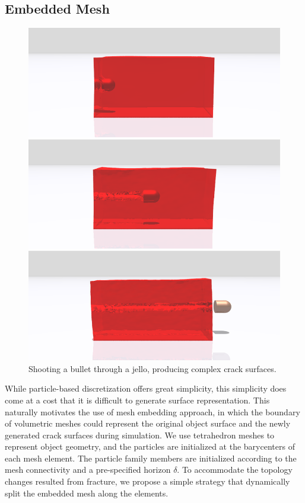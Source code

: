 \subsection{Embedded Mesh}
\begin{figure}[t]
  \centering
  \includegraphics[width=\linewidth]{../figs/demo_jello.png}
  \caption{\label{fig:7}
  Shooting a bullet through a jello, producing complex crack surfaces.
}
\end{figure}
While particle-based discretization offers great simplicity, this simplicity does come at a cost that it is difficult to generate surface representation. This naturally motivates the use of mesh embedding approach, in which the boundary of volumetric meshes could represent the original object surface and the newly generated crack surfaces during simulation. We use tetrahedron meshes to represent object geometry, and the particles are initialized at the barycenters of each mesh element.
The particle family members are initialized according to the mesh connectivity and a pre-specified horizon $\delta$.
To accommodate the topology changes resulted from fracture, we propose a simple strategy that dynamically split the embedded mesh along the elements.

